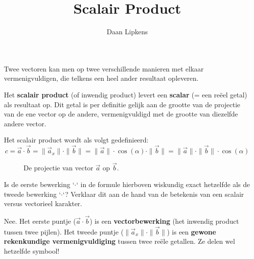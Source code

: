 \documentclass{ximera}
\title{Scalair Product}
\author{Daan Lipkens}
\begin{document}
\begin{abstract}
\end{abstract}
\maketitle


Twee vectoren kan men op twee verschillende manieren met elkaar vermenigvuldigen, die telkens een heel ander resultaat opleveren. 

Het \textbf{scalair product} (of inwendig product) levert een \textbf{scalar} (= een reëel getal) als resultaat op. Dit getal is per definitie gelijk aan de grootte van de projectie van de ene vector op de andere, vermenigvuldigd met de grootte van diezelfde andere vector. 

Het scalair product wordt als volgt gedefinieerd: 
\[ c = \vec{a} \cdot \vec{b} = \| \vec{a}_x \| \cdot \|\vec{b}\| = \|\vec{a}\| \cdot \cos(\alpha) \cdot \|\vec{b}\| = \| \vec{a}\| \cdot \| \vec{b}\| \cdot \cos(\alpha) \]

\begin{figure}[ht!]
    \captionsetup{width=0.85\textwidth}
    \begin{center}
    \end{center}
    \caption{De projectie van vector $\vec{a}$ op $\vec{b}$.}
    \label{fig:scalair_product}
\end{figure}

\begin{question}
    Is de eerste bewerking `$\cdot$` in de formule hierboven wiskundig exact hetzelfde als de tweede bewerking `$\cdot$`? Verklaar dit aan de hand van de betekenis van een scalair versus vectorieel karakter.
    
    \begin{solution}\nl
        Nee. Het eerste puntje ($\vec{a} \cdot \vec{b}$) is een \textbf{vectorbewerking} (het inwendig product tussen twee pijlen). Het tweede puntje ($\| \vec{a}_x \| \cdot \|\vec{b}\|$) is een \textbf{gewone rekenkundige vermenigvuldiging} tussen twee reële getallen. Ze delen wel hetzelfde symbool!
    \end{solution}
\end{question}
\end{document}
